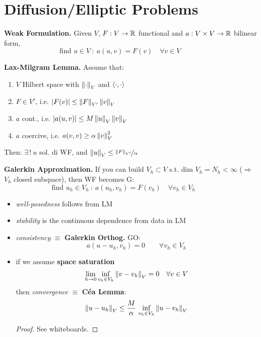 

\section{Diffusion/Elliptic Problems}


\textbf{Weak Formulation.} Given $V$, $F:V\to\mathbb{R}$ functional and $a:V\times V\to\mathbb{R}$ bilinear form,
\begin{equation*}
\boxed{\text{find } u\in V\ :\ a(u,v)=F(v)\quad\forall v\in V}\qquad\quad
\end{equation*}

\smallskip

\textbf{Lax-Milgram Lemma.} Assume that:
\begin{enumerate}
\item $V$ Hilbert space with $\left\lVert \cdot \right\rVert_V$ and $\left\langle \cdot,\cdot \right\rangle$
\item $F\in V'$, i.e. $\left\lvert F(v) \right\rvert\leq \left\lVert F \right\rVert_{V'}\left\lVert v \right\rVert_V$
\item $a$ cont., i.e. $\left\lvert a(u,v) \right\rvert\leq M \left\lVert u \right\rVert_V\left\lVert v \right\rVert_V$
\item $a$ coercive, i.e. $a(v,v)\geq \alpha \left\lVert v \right\rVert_V^2$
\end{enumerate}
Then: $\exists\,!\ u$ sol. di WF, and $\left\lVert u \right\rVert_V\leq \nicefrac{\left\lVert F \right\rVert_{V'}}{\alpha}$

\medskip

\textbf{Galerkin Approximation.} If you can build $V_h\subset V$ s.t. $\text{dim }V_h=N_h<\infty$ ($\Rightarrow$ $V_h$ closed subspace), then WF becomes G:
\begin{equation*}
\boxed{\text{find } u_h\in V_h\ :\ a(u_h,v_h)=F(v_h)\quad\forall v_h\in V_h}\qquad
\end{equation*}

\begin{itemize}
\item \emph{well-posedness} follows from LM
\item \emph{stability} is the continuous dependence from data in LM
\item \emph{consistency} $\equiv$ \textbf{Galerkin Orthog.} GO:
\begin{equation*}
a(u-u_h,v_h)=0\qquad\forall v_h\in V_h
\end{equation*}
\item if we assume \textbf{space saturation}
\begin{equation*}
\lim_{h\to 0}\inf_{v_h\in V_h}\left\lVert v-v_h \right\rVert_V=0\quad\forall v\in V
\end{equation*}
then \emph{convergence} $\equiv$ \textbf{Céa Lemma}:
\begin{equation*}
\left\lVert u-u_h \right\rVert_V\leq \frac{M}{\alpha}\,\inf_{v_h\in V_h}\left\lVert u-v_h \right\rVert_V
\end{equation*}
\begin{proof}
See whiteboards.
\end{proof}
\end{itemize}

